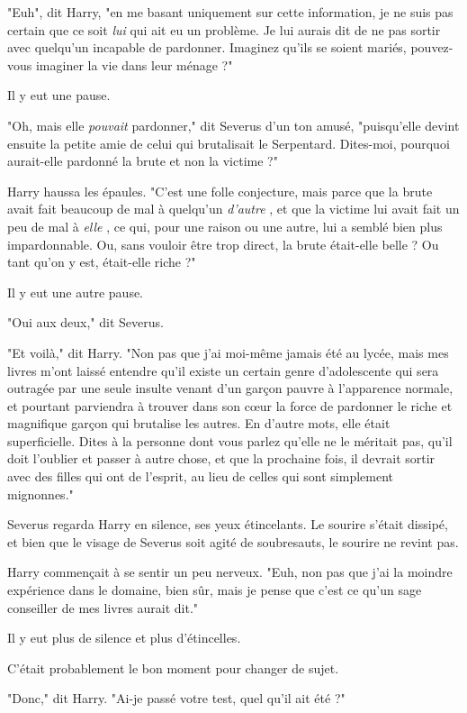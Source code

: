 "Euh", dit Harry, "en me basant uniquement sur cette information, je ne suis pas certain que ce soit \emph{lui}  qui ait eu un problème. Je lui aurais dit de ne pas sortir avec quelqu'un incapable de pardonner. Imaginez qu'ils se soient mariés, pouvez-vous imaginer la vie dans leur ménage ?"

Il y eut une pause.

"Oh, mais elle \emph{pouvait}  pardonner," dit Severus d'un ton amusé, "puisqu'elle devint ensuite la petite amie de celui qui brutalisait le Serpentard. Dites-moi, pourquoi aurait-elle pardonné la brute et non la victime ?"

Harry haussa les épaules. "C'est une folle conjecture, mais parce que la brute avait fait beaucoup de mal à quelqu'un \emph{d'autre} , et que la victime lui avait fait un peu de mal à \emph{elle} , ce qui, pour une raison ou une autre, lui a semblé bien plus impardonnable. Ou, sans vouloir être trop direct, la brute était-elle belle ? Ou tant qu'on y est, était-elle riche ?"

Il y eut une autre pause.

"Oui aux deux," dit Severus.

"Et voilà," dit Harry. "Non pas que j'ai moi-même jamais été au lycée, mais mes livres m'ont laissé entendre qu'il existe un certain genre d'adolescente qui sera outragée par une seule insulte venant d'un garçon pauvre à l'apparence normale, et pourtant parviendra à trouver dans son cœur la force de pardonner le riche et magnifique garçon qui brutalise les autres. En d'autre mots, elle était superficielle. Dites à la personne dont vous parlez qu'elle ne le méritait pas, qu'il doit l'oublier et passer à autre chose, et que la prochaine fois, il devrait sortir avec des filles qui ont de l'esprit, au lieu de celles qui sont simplement mignonnes."

Severus regarda Harry en silence, ses yeux étincelants. Le sourire s'était dissipé, et bien que le visage de Severus soit agité de soubresauts, le sourire ne revint pas.

Harry commençait à se sentir un peu nerveux. "Euh, non pas que j'ai la moindre expérience dans le domaine, bien sûr, mais je pense que c'est ce qu'un sage conseiller de mes livres aurait dit."

Il y eut plus de silence et plus d'étincelles.

C'était probablement le bon moment pour changer de sujet.

"Donc," dit Harry. "Ai-je passé votre test, quel qu'il ait été ?"

